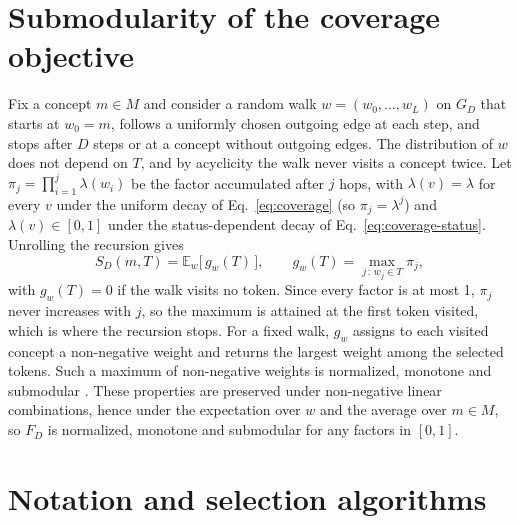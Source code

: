 
\section{Submodularity of the coverage objective}
\label{app:submodular}

Fix a concept $m \in M$ and consider a random walk $w = (w_0, \dots, w_L)$ on $G_D$ that starts at $w_0 = m$, follows a uniformly chosen outgoing edge at each step, and stops after $D$ steps or at a concept without outgoing edges.
The distribution of $w$ does not depend on $T$, and by acyclicity the walk never visits a concept twice.
Let $\pi_j = \prod_{i=1}^{j} \lambda(w_i)$ be the factor accumulated after $j$ hops, with $\lambda(v) = \lambda$ for every $v$ under the uniform decay of Eq.~\eqref{eq:coverage} (so $\pi_j = \lambda^j$) and $\lambda(v) \in [0, 1]$ under the status-dependent decay of Eq.~\eqref{eq:coverage-status}.
Unrolling the recursion gives
\[
S_D(m, T) = \mathbb{E}_w\big[\, g_w(T) \,\big], \qquad g_w(T) = \max_{j \,:\, w_j \in T} \pi_j ,
\]
with $g_w(T) = 0$ if the walk visits no token.
Since every factor is at most 1, $\pi_j$ never increases with $j$, so the maximum is attained at the first token visited, which is where the recursion stops.
For a fixed walk, $g_w$ assigns to each visited concept a non-negative weight and returns the largest weight among the selected tokens.
Such a maximum of non-negative weights is normalized, monotone and submodular \cite{krause2014submodular}.
These properties are preserved under non-negative linear combinations, hence under the expectation over $w$ and the average over $m \in M$, so $F_D$ is normalized, monotone and submodular for any factors in $[0, 1]$.

\section{Notation and selection algorithms}
\label{app:notation}
\label{app:algorithms}

